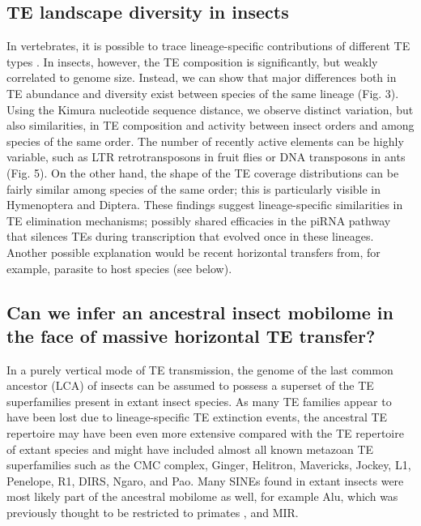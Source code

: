 \subsection{TE landscape diversity in
insects}\label{te-landscape-diversity-in-insects}

In vertebrates, it is possible to trace lineage-specific contributions
of different TE types \citep{Chalopin2015}. In insects, however, the TE
composition is significantly, but weakly correlated to genome size.
Instead, we can show that major differences both in TE abundance and
diversity exist between species of the same lineage (Fig. 3). Using the
Kimura nucleotide sequence distance, we observe distinct variation, but
also similarities, in TE composition and activity between insect orders
and among species of the same order. The number of recently active
elements can be highly variable, such as LTR retrotransposons in fruit
flies or DNA transposons in ants (Fig. 5). On the other hand, the shape
of the TE coverage distributions can be fairly similar among species of
the same order; this is particularly visible in Hymenoptera and Diptera.
These findings suggest lineage-specific similarities in TE elimination
mechanisms; possibly shared efficacies in the piRNA pathway that
silences TEs during transcription \citep{LeThomas2013} that evolved once
in these lineages. Another possible explanation would be recent
horizontal transfers from, for example, parasite to host species (see
below).

\subsection{Can we infer an ancestral insect mobilome in the face of
massive horizontal TE
transfer?}\label{can-we-infer-an-ancestral-insect-mobilome-in-the-face-of-massive-horizontal-te-transfer}

In a purely vertical mode of TE transmission, the genome of the last
common ancestor (LCA) of insects can be assumed to possess a superset of
the TE superfamilies present in extant insect species. As many TE
families appear to have been lost due to lineage-specific TE extinction
events, the ancestral TE repertoire may have been even more extensive
compared with the TE repertoire of extant species and might have
included almost all known metazoan TE superfamilies such as the CMC
complex, Ginger, Helitron, Mavericks, Jockey, L1, Penelope, R1, DIRS,
Ngaro, and Pao. Many SINEs found in extant insects were most likely part
of the ancestral mobilome as well, for example Alu, which was previously
thought to be restricted to primates \citep{Deininger2011}, and MIR.

